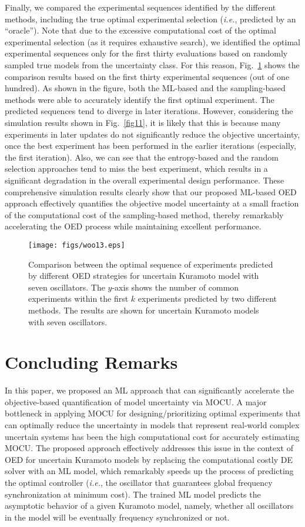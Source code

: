 \documentclass{article}
\begin{document}
Finally, we compared the experimental sequences identified by the different methods, including the true optimal experimental selection (\textit{i.e.}, predicted by an ``oracle''). Note that due to the excessive computational cost of the optimal experimental selection (as it requires exhaustive search), we identified the optimal experimental sequences only for the first thirty evaluations based on randomly sampled true models from the uncertainty class. For this reason, Fig.~\ref{fig13} shows the comparison results based on the first thirty experimental sequences (out of one hundred). As shown in the figure, both the ML-based and the sampling-based methods were able to accurately identify the first optimal experiment. The predicted sequences tend to diverge in later iterations. However, considering the simulation results shown in Fig.~\ref{fig11}, it is likely that this is because many experiments in later updates do not significantly reduce the objective uncertainty, once the best experiment has been performed in the earlier iterations (especially, the first iteration). Also, we can see that the entropy-based and the random selection approaches tend to miss the best experiment, which results in a significant degradation in the overall experimental design performance. These comprehensive simulation results clearly show that our proposed ML-based OED approach effectively quantifies the objective model uncertainty at a small fraction of the computational cost of the sampling-based method, thereby remarkably accelerating the OED process while maintaining excellent performance.
\begin{figure}
\centering
\texttt{[image: figs/woo13.eps]}
\caption{
Comparison between the optimal sequence of experiments predicted by different OED strategies for uncertain Kuramoto model with seven oscillators. The $y$-axis shows the number of common experiments within the first $k$ experiments predicted by two different methods. The results are shown for uncertain Kuramoto models with seven oscillators.}
\label{fig13}
\end{figure}

\section{Concluding Remarks}
\label{sec:conclusion}
In this paper, we proposed an ML approach that can significantly accelerate the objective-based quantification of model uncertainty via MOCU. A major bottleneck in applying MOCU for designing/prioritizing optimal experiments that can optimally reduce the uncertainty in models that represent real-world complex uncertain systems has been the high computational cost for accurately estimating MOCU. The proposed approach effectively addresses this issue in the context of OED for uncertain Kuramoto models by replacing the computational costly DE solver with an ML model, which remarkably speeds up the process of predicting the optimal controller (\textit{i.e.}, the oscillator that guarantees global frequency synchronization at minimum cost). The trained ML model predicts the asymptotic behavior of a given Kuramoto model, namely, whether all oscillators in the model will be eventually frequency synchronized or not. 
\end{document}
